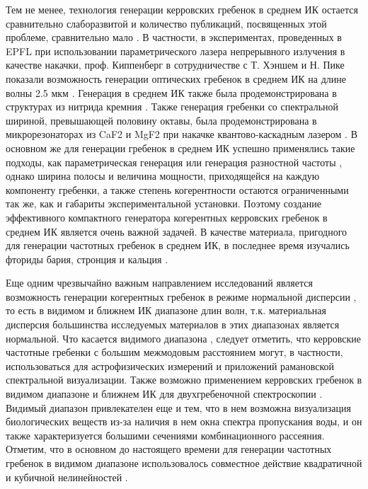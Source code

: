 Тем не менее, технология генерации керровских гребенок в среднем ИК остается сравнительно слаборазвитой и количество публикаций, посвященных этой проблеме, сравнительно мало \cite{Schliesser2012,Wang2013,Griffith2015,Griffith2016,Savchenkov2015}. В частности, в экспериментах, проведенных в EPFL при использовании параметрического лазера непрерывного излучения в качестве накачки, проф. Киппенберг в сотрудничестве с Т. Хэншем и Н. Пике показали возможность генерации оптических гребенок в среднем ИК на длине волны 2.5 мкм \cite{Wang2013}. Генерация в среднем ИК также была продемонстрирована в структурах из нитрида кремния \cite{Griffith2015,Griffith2016}. Также генерация гребенки со спектральной шириной, превышающей половину октавы, была продемонстрирована в микрорезонаторах из CaF2 и MgF2 при накачке квантово-каскадным лазером \cite{Savchenkov2015}. В основном же для генерации гребенок в среднем ИК успешно применялись такие подходы, как параметрическая генерация или генерация разностной частоты \cite{Adler2009,Leindecker2011,Maddaloni2006,Cruz2015}, однако ширина полосы и величина мощности, приходящейся на каждую компоненту гребенки, а также степень когерентности остаются ограниченными так же, как и габариты экспериментальной установки. Поэтому создание эффективного компактного генератора когерентных керровских гребенок в среднем ИК является очень важной задачей. В качестве материала, пригодного для генерации частотных гребенок в среднем ИК, в последнее время изучались фториды бария, стронция и кальция \cite{Grudinin2016,Lin2015,Way2012,Lecaplain2016}.


Еще одним чрезвычайно важным направлением исследований является возможность генерации когерентных гребенок в режиме нормальной дисперсии \cite{Xue2016nano}, то есть в видимом и ближнем ИК диапазоне длин волн, т.к. материальная дисперсия большинства исследуемых материалов в этих диапазонах является нормальной. Что касается видимого диапазона \cite{Miller2014,Jung2014}, следует отметить, что керровские частотные гребенки с большим межмодовым расстоянием могут, в частности, использоваться для астрофизических измерений \cite{Benedick2010,Glenday2015} и приложений рамановской спектральной визуализации. Также возможно применением керровских гребенок в видимом диапазоне и ближнем ИК для двухгребеночной спектроскопии \cite{Zhu2013}. Видимый диапазон привлекателен еще и тем, что в нем возможна визуализация биологических веществ из-за наличия в нем окна спектра пропускания воды, и он также характеризуется большими сечениями комбинационного рассеяния. Отметим, что в основном до настоящего времени для генерации частотных гребенок в видимом диапазоне использовалось совместное действие квадратичной и кубичной нелинейностей \cite{Miller2014,Jung2014}.


